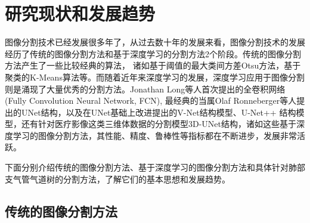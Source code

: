 \section{研究现状和发展趋势}


图像分割技术已经发展很多年了，从过去数十年的发展来看，图像分割技术的发展经历了传统的图像分割方法和基于深度学习的分割方法2个阶段。传统的图像分割方法产生了一些比较经典的算法，
诸如基于阈值的最大类间方差Otsu方法\cite{otsu1979threshold}，基于聚类的K-Means算法\cite{macqueen1965some}等。而随着近年来深度学习的发展，深度学习应用于图像分割
则是涌现了大量优秀的分割方法。Jonathan Long等人\cite{long2015fully}首次提出的全卷积网络(Fully Convolution Neural Network, FCN), 最经典的当属Olaf Ronneberger等人\cite{ronneberger2015u}提出的UNet结构，以及在UNet基础上改进提出的V-Net\cite{milletari2016v}结构模型、U-Net++\cite{zhou2019unet++}
结构模型，还有针对医疗影像这类三维体数据的分割模型3D-UNet结构\cite{cciccek20163d}，诸如这些基于深度学习的图像分割方法，其性能、精度、鲁棒性等指标都在不断进步，发展非常活跃。

下面分别介绍传统的图像分割方法、基于深度学习的图像分割方法和具体针对肺部支气管气道树的分割方法，了解它们的基本思想和发展趋势。

	\subsection{传统的图像分割方法}
	
